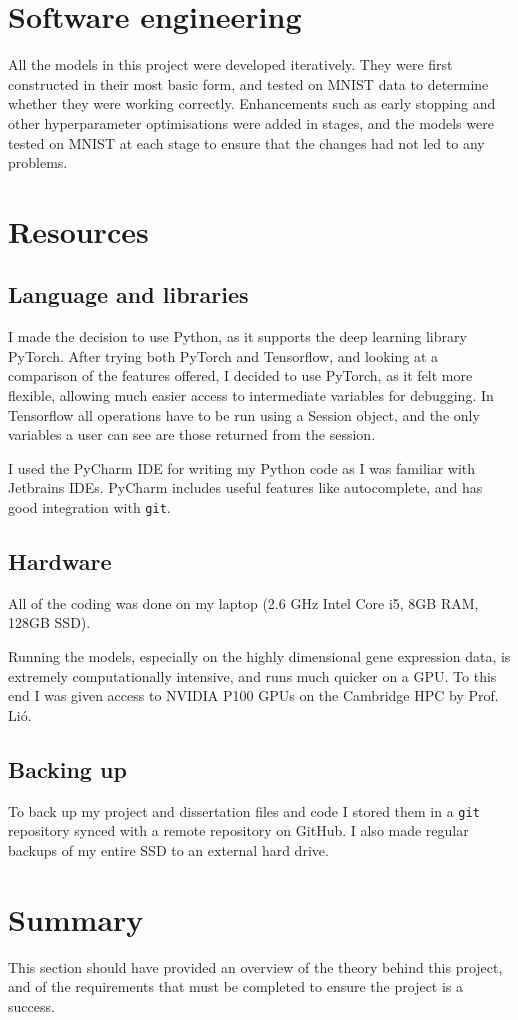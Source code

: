 \section{Software engineering}

All the models in this project were developed iteratively. They were first constructed in their most basic form, and tested on MNIST 
data to determine whether they were working correctly. Enhancements such as early stopping and other hyperparameter optimisations were 
added in stages, and the models were tested on MNIST at each stage to ensure that the changes had not led to any problems.

\section{Resources}

\subsection{Language and libraries}
I made the decision to use Python, as it supports the deep learning library PyTorch.  After trying both PyTorch and Tensorflow, 
and looking at a comparison of the features offered, I decided to 
use PyTorch, as it felt more flexible, allowing much easier access 
to intermediate variables for debugging. In Tensorflow all operations have to be run using a Session object, and the only variables a 
user can see are those returned from the session.

I used the PyCharm IDE for writing my Python code as I was familiar with Jetbrains IDEs.
PyCharm includes useful features like autocomplete, and has good integration with \texttt{git}.

\subsection{Hardware}
All of the coding was done on my laptop (2.6 GHz Intel Core i5, 8GB RAM, 128GB SSD).

Running the models, especially on the highly dimensional gene expression data, is extremely computationally intensive, and runs much 
quicker on a GPU. To this end I was given access to NVIDIA P100 GPUs on the Cambridge HPC by Prof. Li\'o.

\subsection{Backing up}
To back up my project and dissertation files and code I stored them in a \texttt{git} repository synced with a remote repository on GitHub. I also 
made regular backups of my entire SSD to an external hard drive.

\section{Summary}
This section should have provided an overview of the theory behind this project, and of the requirements that must be completed to 
ensure the project is a success.